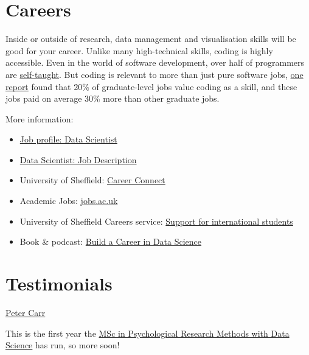 \documentclass[
]{book}
\providecommand{\tightlist}{%
  \setlength{\itemsep}{0pt}\setlength{\parskip}{0pt}}
\begin{document}
\hypertarget{careers}{%
\section{Careers}\label{careers}}

Inside or outside of research, data management and visualisation skills will be good for your career. Unlike many high-technical skills, coding is highly accessible. Even in the world of software development, over half of programmers are \href{https://www.infoworld.com/article/2908474/stack-overflow-survey-finds-nearly-half-have-no-degree-in-computer-science.html}{self-taught}. But coding is relevant to more than just pure software jobs, \href{https://www.burning-glass.com/research-project/coding-skills/}{one report} found that 20\% of graduate-level jobs value coding as a skill, and these jobs paid on average 30\% more than other graduate jobs.

More information:

\begin{itemize}
\tightlist
\item
  \href{https://www.prospects.ac.uk/job-profiles/data-scientist}{Job profile: Data Scientist}
\item
  \href{https://targetjobs.co.uk/careers-advice/job-descriptions/454123-data-scientist-job-description}{Data Scientist: Job Description}
\item
  University of Sheffield: \href{https://www.sheffield.ac.uk/careers/careerconnect}{Career Connect}
\item
  Academic Jobs: \href{https://www.jobs.ac.uk/}{jobs.ac.uk}
\item
  University of Sheffield Careers service: \href{https://www.sheffield.ac.uk/careers/services/international}{Support for international students}
\item
  Book \& podcast: \href{https://podcast.bestbook.cool/}{Build a Career in Data Science}
\end{itemize}

\hypertarget{testimonials}{%
\section{Testimonials}\label{testimonials}}

\href{https://www.sheffield.ac.uk/psychology/prospectivepg/masters/stories/peter-carr-1.817457}{Peter Carr}

This is the first year the \href{https://www.sheffield.ac.uk/psychology/prospectivepg/masters/data-science}{MSc in Psychological Research Methods with Data Science} has run, so more soon!
\end{document}
